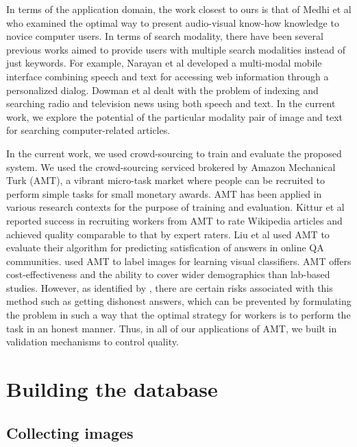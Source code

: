 \documentclass{www2010-submission}
\begin{document}
In terms of the application domain, the work closest to ours is that
of Medhi et al \cite{Medhi} who examined the optimal way to present
audio-visual know-how knowledge to novice computer users.  In terms of
search modality, there have been several previous works aimed to
provide users with multiple search modalities instead of just
keywords. For example, Narayan et al \cite{Narayan} developed a
multi-modal mobile interface combining speech and text for accessing
web information through a personalized dialog.  Dowman et al
\cite{Dowman} dealt with the problem of indexing and searching radio
and television news using both speech and text. In the current work,
we explore the potential of the particular modality pair of image and
text for searching computer-related articles.


In the current work, we used crowd-sourcing to train and evaluate the
proposed system.  We used the crowd-sourcing serviced brokered by
Amazon Mechanical Turk (AMT), a vibrant micro-task market where people
can be recruited to perform simple tasks for small monetary
awards. AMT has been applied in various research contexts for the
purpose of training and evaluation. Kittur et al \cite{Kittur}
reported success in recruiting workers from AMT to rate Wikipedia
articles and achieved quality comparable to that by expert raters.
Liu et al \cite{Liu} used AMT to evaluate their algorithm for
predicting satisfication of answers in online QA
communities. \cite{Vijayanarasimha} used AMT to label images for
learning visual classifiers.  AMT offers cost-effectiveness and the ability
to cover wider demographics than lab-based studies. However, as
identified by \cite{Kittur}, there are certain risks associated with
this method such as getting dishonest answers, which can be prevented by
formulating the problem in such a way that the optimal strategy for workers is to
perform the task in an honest manner. Thus, in all of our
applications of AMT, we built in validation mechanisms to control
quality.

\section{Building the database}

\subsection{Collecting images}
\end{document}
